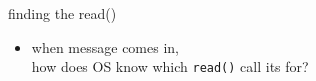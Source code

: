 \begin{frame}{finding the read()}
    \begin{itemize}
    \item when message comes in, \\
    how does OS know which \texttt{read()} call its for?
    \end{itemize}
\end{frame}
